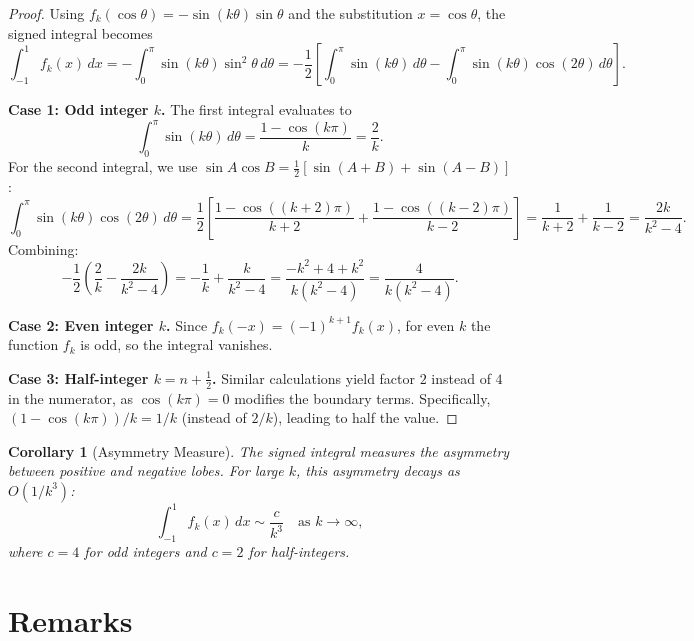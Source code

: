 \documentclass[11pt]{article}
\newtheorem{corollary}[theorem]{Corollary}
\begin{document}
\begin{proof}
Using $f_k(\cos\theta) = -\sin(k\theta)\sin\theta$ and the substitution
$x = \cos\theta$, the signed integral becomes
\[
\int_{-1}^{1} f_k(x)\,dx = -\int_0^\pi \sin(k\theta)\sin^2\theta\,d\theta
= -\frac{1}{2}\left[\int_0^\pi \sin(k\theta)\,d\theta
- \int_0^\pi \sin(k\theta)\cos(2\theta)\,d\theta\right].
\]

\textbf{Case 1: Odd integer $k$.}
The first integral evaluates to
\[
\int_0^\pi \sin(k\theta)\,d\theta = \frac{1 - \cos(k\pi)}{k} = \frac{2}{k}.
\]
For the second integral, we use $\sin A \cos B = \frac{1}{2}[\sin(A+B) + \sin(A-B)]$:
\[
\int_0^\pi \sin(k\theta)\cos(2\theta)\,d\theta
= \frac{1}{2}\left[\frac{1-\cos((k+2)\pi)}{k+2} + \frac{1-\cos((k-2)\pi)}{k-2}\right]
= \frac{1}{k+2} + \frac{1}{k-2} = \frac{2k}{k^2-4}.
\]
Combining:
\[
-\frac{1}{2}\left(\frac{2}{k} - \frac{2k}{k^2-4}\right)
= -\frac{1}{k} + \frac{k}{k^2-4}
= \frac{-k^2+4+k^2}{k(k^2-4)} = \frac{4}{k(k^2-4)}.
\]

\textbf{Case 2: Even integer $k$.}
Since $f_k(-x) = (-1)^{k+1}f_k(x)$, for even $k$ the function $f_k$ is odd,
so the integral vanishes.

\textbf{Case 3: Half-integer $k = n + \frac{1}{2}$.}
Similar calculations yield factor $2$ instead of $4$ in the numerator,
as $\cos(k\pi) = 0$ modifies the boundary terms. Specifically,
$(1 - \cos(k\pi))/k = 1/k$ (instead of $2/k$), leading to half the value.
\end{proof}

\begin{corollary}[Asymmetry Measure]
The signed integral measures the \emph{asymmetry} between positive and negative lobes.
For large $k$, this asymmetry decays as $O(1/k^3)$:
\[
\int_{-1}^{1} f_k(x)\,dx \sim \frac{c}{k^3} \quad \text{as } k \to \infty,
\]
where $c = 4$ for odd integers and $c = 2$ for half-integers.
\end{corollary}

\section{Remarks}
\end{document}
